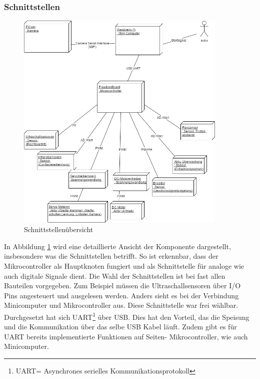 \subsubsection{Schnittstellen}
\begin{figure}[H]%
\centering
\includegraphics[width=0.9\textwidth]{03_Loesungskonzept/pictures/Verteilungsdiagramm.png}
\caption{Schnittstellenübersicht}
\label{fig:Verteilungsdiagramm}
\end{figure}\flushleft
In Abbildung \ref{fig:Verteilungsdiagramm} wird eine detaillierte Ansicht der Komponente dargestellt, insbesondere was die Schnittstellen betrifft. So ist erkennbar, dass der Mikrocontroller als Hauptknoten fungiert und als Schnittstelle für analoge wie auch digitale Signale dient. Die Wahl der Schnittstellen ist bei fast allen Bauteilen vorgegeben. Zum Beispiel müssen die Ultraschallsensoren über I/O Pins angesteuert und ausgelesen werden. Anders sieht es bei der Verbindung Minicomputer und Mikrocontroller aus. Diese Schnittstelle war frei wählbar. Durchgesetzt hat sich UART\footnote{UART= Asynchrones serielles Kommunikationsprotokoll} über USB. Dies hat den Vorteil, das die Speisung und die Kommunikation über das selbe USB Kabel läuft. Zudem gibt es für UART bereits implementierte Funktionen auf Seiten- Mikrocontroller, wie auch Minicomputer.
